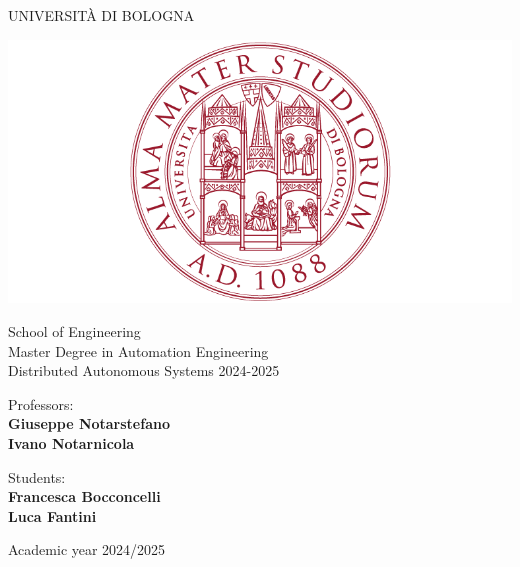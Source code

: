 \thispagestyle{empty}                                                 
\begin{center}                                                            
    \vspace{5mm}
    {\LARGE UNIVERSIT\`A DI BOLOGNA} \\                       
      \vspace{5mm}
\end{center}
\begin{center}
  \includegraphics[scale=.27]{figs/logo_unibo}
\end{center}
\begin{center}
      \vspace{5mm}
      {\LARGE School of Engineering} \\
        \vspace{3mm}
      {\Large Master Degree in Automation Engineering} \\
      \vspace{20mm}
      {\LARGE Distributed Autonomous Systems 2024-2025} \\
      \vspace{15mm}
\end{center}
\begin{flushleft}                                                                              
     {\large Professors:}\\
     \textbf{\@ Giuseppe Notarstefano} \\
     \textbf{\@ Ivano Notarnicola} \\        
     \vspace{13mm}
\end{flushleft}
\begin{flushright}
      {\large Students:}\\
     \textbf{\@ Francesca Bocconcelli} \\
     \textbf{\@ Luca Fantini} \\        
     \vspace{13mm}
\end{flushright}        %
\begin{center}
\vfill
      {\large Academic year \@2024/2025} \\
\end{center}

